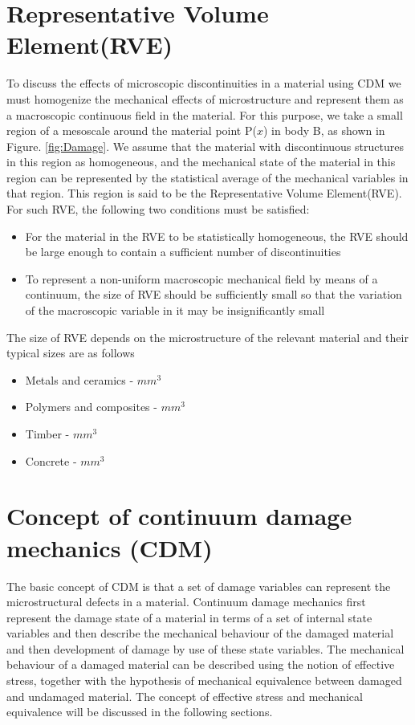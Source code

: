 \documentclass[12pt,twoside]{report}
\begin{document}
\section{Representative Volume Element(RVE)}
\indent\indent\indent  To discuss the effects of microscopic discontinuities in a material using CDM we must homogenize the mechanical effects of microstructure and represent them as a macroscopic continuous field in the material. For this purpose, we take a small region of a mesoscale around the material point P($x$) in body B, as shown in Figure. \ref{fig:Damage}. We assume that the material with discontinuous structures in this region as homogeneous, and the mechanical state of the material in this region can be represented by the statistical average of the mechanical variables in that region. This region is said to be the Representative Volume Element(RVE). For such RVE, the following two conditions must be satisfied:
\begin{itemize}
\item  For the material in the RVE to be statistically homogeneous, the RVE should be large enough to contain a sufficient number of discontinuities
\item To represent a non-uniform macroscopic mechanical field by means of a continuum, the size of RVE should be sufficiently small so that the variation of the macroscopic variable in it may be insignificantly small
\end{itemize}
The size of RVE depends on the microstructure of the relevant material and their typical sizes are as follows
\begin{itemize}
\item Metals and ceramics  \;    -    \;$mm^3$
\item Polymers and composites \;   -   \;$mm^3$
\item Timber\; - \;$mm^3$
\item Concrete \; - \;$mm^3$
\end{itemize}

\section{Concept of continuum damage mechanics (CDM)}
\indent\indent\indent The basic concept of CDM is that a set of damage variables can represent the microstructural defects in a material. Continuum damage mechanics first represent the damage state of a material in terms of a set of internal state variables and then describe the mechanical behaviour of the damaged material and then development of damage by use of these state variables. The mechanical behaviour of a damaged material can be described using the notion of effective stress, together with the hypothesis of mechanical equivalence between damaged and undamaged material. The concept of effective stress and mechanical equivalence will be discussed in the following sections.
\end{document}
